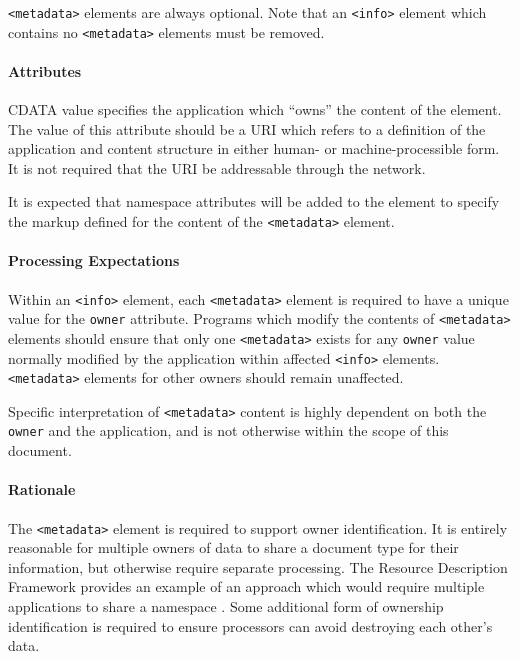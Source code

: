 \documentclass{howto}
\newcommand{\element}[1]{\texttt{<#1>}}
\newcommand{\attribute}[1]{\texttt{#1}}
\begin{document}
      \element{metadata} elements are always optional.  Note that an
      \element{info} element which contains no \element{metadata}
      elements must be removed.

      \paragraph*{Attributes}
        \begin{definitions}
          \term{\attribute{owner}, \emph{required}}
            CDATA value specifies the application which ``owns'' the
            content of the element.  The value of this attribute
            should be a URI which refers to a definition of the
            application and content structure in either human- or
            machine-processible form.  It is not required that the URI
            be addressable through the network.
	\end{definitions}

        It is expected that namespace attributes will be added to
        the element to specify the markup defined for the content of
        the \element{metadata} element.

      \paragraph*{Processing Expectations}
        Within an \element{info} element, each \element{metadata}
        element is required to have a unique value for the
        \attribute{owner} attribute.  Programs which modify the
        contents of \element{metadata} elements should ensure that
        only one \element{metadata} exists for any \attribute{owner}
        value normally modified by the application within affected
        \element{info} elements.  \element{metadata} elements for
        other owners should remain unaffected.

        Specific interpretation of \element{metadata} content is
        highly dependent on both the \attribute{owner} and the
        application, and is not otherwise within the scope of this
        document.

      \paragraph*{Rationale}
        The \element{metadata} element is required to support owner
        identification.  It is entirely reasonable for multiple owners
        of data to share a document type for their information, but
        otherwise require separate processing.  The Resource
        Description Framework provides an example of an approach which
        would require multiple applications to share a namespace
        \cite{w3c-rdf-syntax,w3c-rdf-schema}.  Some additional form of
        ownership identification is required to ensure processors can
        avoid destroying each other's data.
\end{document}
